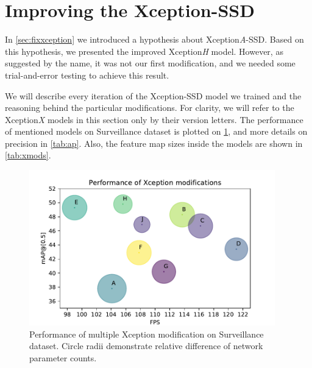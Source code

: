 \section{Improving the Xception-SSD}
In \cref{sec:fixxception} we introduced a hypothesis about Xception\textit{A}-SSD. Based on this hypothesis, we presented the improved Xception\textit{H} model. However, as suggested by the name, it was not our first modification, and we needed some trial-and-error testing to achieve this result.

We will describe every iteration of the Xception-SSD model we trained and the reasoning behind the particular modifications. For clarity, we will refer to the Xception\textit{X} models in this section only by their version letters. The performance of mentioned models on Surveillance dataset is plotted on \cref{fig:xception_perf}, and more details on precision in \cref{tab:ap}. Also, the feature map sizes inside the models are shown in \cref{tab:xmods}.


\begin{figure}
    \centering
    \includegraphics[width=0.95\textwidth]{img/fps_map_x}
    \caption[Performance of multiple Xception modification on Surveillance dataset]{Performance of multiple Xception modification on Surveillance dataset. Circle radii demonstrate relative difference of network parameter counts.} 
    \label{fig:xception_perf}
\end{figure}

